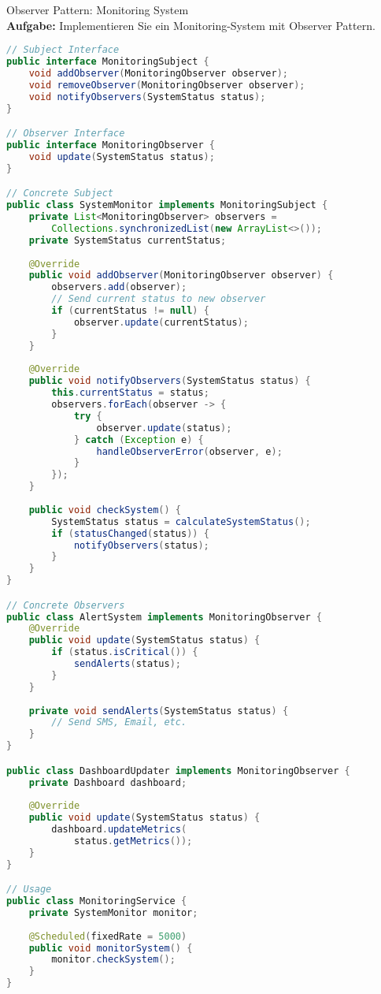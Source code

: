 \begin{example2}[breakable]{Observer Pattern: Monitoring System}\\
\textbf{Aufgabe:} Implementieren Sie ein Monitoring-System mit Observer Pattern.

\begin{lstlisting}[language=Java, style=basesmol]
// Subject Interface
public interface MonitoringSubject {
    void addObserver(MonitoringObserver observer);
    void removeObserver(MonitoringObserver observer);
    void notifyObservers(SystemStatus status);
}

// Observer Interface
public interface MonitoringObserver {
    void update(SystemStatus status);
}

// Concrete Subject
public class SystemMonitor implements MonitoringSubject {
    private List<MonitoringObserver> observers = 
        Collections.synchronizedList(new ArrayList<>());
    private SystemStatus currentStatus;
    
    @Override
    public void addObserver(MonitoringObserver observer) {
        observers.add(observer);
        // Send current status to new observer
        if (currentStatus != null) {
            observer.update(currentStatus);
        }
    }
    
    @Override
    public void notifyObservers(SystemStatus status) {
        this.currentStatus = status;
        observers.forEach(observer -> {
            try {
                observer.update(status);
            } catch (Exception e) {
                handleObserverError(observer, e);
            }
        });
    }
    
    public void checkSystem() {
        SystemStatus status = calculateSystemStatus();
        if (statusChanged(status)) {
            notifyObservers(status);
        }
    }
}

// Concrete Observers
public class AlertSystem implements MonitoringObserver {
    @Override
    public void update(SystemStatus status) {
        if (status.isCritical()) {
            sendAlerts(status);
        }
    }
    
    private void sendAlerts(SystemStatus status) {
        // Send SMS, Email, etc.
    }
}

public class DashboardUpdater implements MonitoringObserver {
    private Dashboard dashboard;
    
    @Override
    public void update(SystemStatus status) {
        dashboard.updateMetrics(
            status.getMetrics());
    }
}

// Usage
public class MonitoringService {
    private SystemMonitor monitor;
    
    @Scheduled(fixedRate = 5000)
    public void monitorSystem() {
        monitor.checkSystem();
    }
}
\end{lstlisting}
\end{example2}

